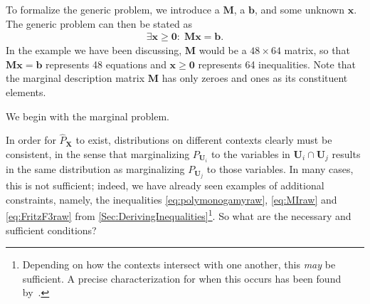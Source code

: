 {\color{blue} To formalize the generic problem, we introduce \color{black}
  a  $\bm{M}$, a  $\bm{b}$, and some unknown  $\bm{x}$. The generic
  problem can then be stated as
\begin{align}\label{eq:marginalproblemgeneric}
    \exists {\bm{x} \geq \bm{0}} :\; \bm{M}\bm{x}=\bm{b}.
\end{align}
In the example we have been discussing, $\bm{M}$ would be a $48\times 64$ matrix, so that $\bm{M}\bm{x}=\bm{b}$ represents 48 equations and $\bm{x} \geq \bm{0}$ represents 64 inequalities. Note that the marginal description matrix $\bm{M}$  has only zeroes and ones as its constituent elements.

 
 \color{blue} We begin with the marginal problem.  \color{black}
 
In order for $\hat{P}_{\bm{X}}$ to exist, \color{blue} distributions on different contexts \color{black} clearly must be consistent, in the sense that marginalizing $P_{\bm{U}_i}$ to the variables in $\bm{U}_i\cap\bm{U}_j$ results in the same distribution as marginalizing $P_{\bm{U}_j}$ to those variables.  
  In many cases, this is not sufficient; indeed, we have already seen examples of additional constraints, namely, the inequalities \eqref{eq:polymonogamyraw}, \eqref{eq:MIraw} and \eqref{eq:FritzF3raw} from \cref{Sec:DerivingInequalities}\footnote{Depending on how the contexts intersect with one another, this \emph{may} be sufficient. A precise characterization for when this occurs has been found by~\citet{vorobev_extension_1960}.}. 
So what are the necessary and sufficient conditions?

}
